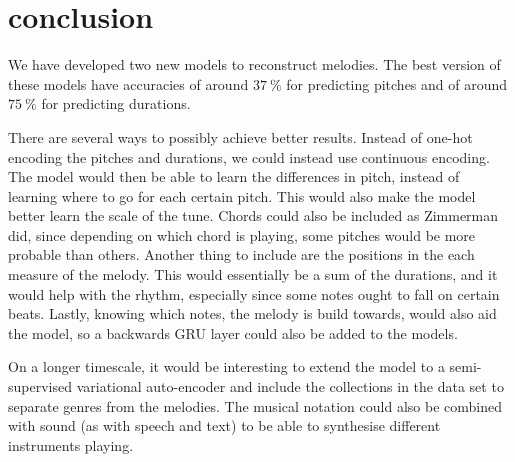 \section{conclusion}
\label{sec:conclusion}

We have developed two new models to reconstruct melodies.
The best version of these models have accuracies of around $\SI{37}{\%}$ for predicting pitches and of around $\SI{75}{\%}$ for predicting durations.

There are several ways to possibly achieve better results.
Instead of one-hot encoding the pitches and durations, we could instead use continuous encoding.
The model would then be able to learn the differences in pitch, instead of learning where to go for each certain pitch.
This would also make the model better learn the scale of the tune.
Chords could also be included as Zimmerman \cite{Zimmerman2016} did, since depending on which chord is playing, some pitches would be more probable than others.
Another thing to include are the positions in the each measure of the melody. This would essentially be a sum of the durations, and it would help with the rhythm, especially since some notes ought to fall on certain beats.
Lastly, knowing which notes, the melody is build towards, would also aid the model, so a backwards GRU layer could also be added to the models.

On a longer timescale, it would be interesting to extend the model to a semi-supervised variational auto-encoder and include the collections in the data set to separate genres from the melodies.
The musical notation could also be combined with sound (as with speech and text) to be able to synthesise different instruments playing.
